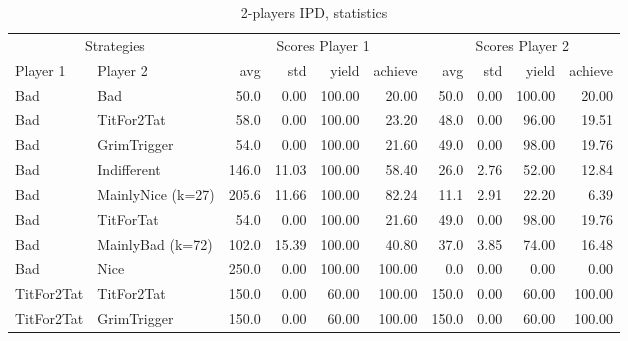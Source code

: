 \documentclass[journal,10pt,twoside]{IEEEtran}
\begin{document}

\begin{table}[ht]
    \caption{2-players IPD, statistics}
    \label{tab:ipd2p}
    \centering
    \begin{tabular}{ll|rrrr|rrrr} \toprule
           \multicolumn{2}{c}{Strategies}     & \multicolumn{4}{c}{Scores Player 1} & \multicolumn{4}{c}{Scores Player 2} \\
        Player 1          & Player 2          &   avg &   std &  yield &    achieve &   avg &   std &  yield &    achieve \\ \midrule
        Bad               & Bad               &  50.0 &  0.00 & 100.00 &      20.00 &  50.0 &  0.00 & 100.00 &      20.00 \\
        Bad               & TitFor2Tat        &  58.0 &  0.00 & 100.00 &      23.20 &  48.0 &  0.00 &  96.00 &      19.51 \\
        Bad               & GrimTrigger       &  54.0 &  0.00 & 100.00 &      21.60 &  49.0 &  0.00 &  98.00 &      19.76 \\
        Bad               & Indifferent       & 146.0 & 11.03 & 100.00 &      58.40 &  26.0 &  2.76 &  52.00 &      12.84 \\
        Bad               & MainlyNice (k=27) & 205.6 & 11.66 & 100.00 &      82.24 &  11.1 &  2.91 &  22.20 &       6.39 \\
        Bad               & TitForTat         &  54.0 &  0.00 & 100.00 &      21.60 &  49.0 &  0.00 &  98.00 &      19.76 \\
        Bad               & MainlyBad (k=72)  & 102.0 & 15.39 & 100.00 &      40.80 &  37.0 &  3.85 &  74.00 &      16.48 \\
        Bad               & Nice              & 250.0 &  0.00 & 100.00 &     100.00 &   0.0 &  0.00 &   0.00 &       0.00 \\
        TitFor2Tat        & TitFor2Tat        & 150.0 &  0.00 &  60.00 &     100.00 & 150.0 &  0.00 &  60.00 &     100.00 \\
        TitFor2Tat        & GrimTrigger       & 150.0 &  0.00 &  60.00 &     100.00 & 150.0 &  0.00 &  60.00 &     100.00 \\

\end{tabular}
\end{table}
\end{document}
